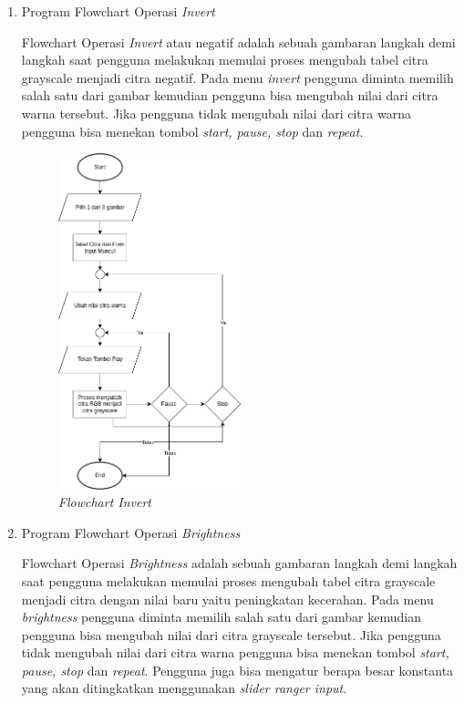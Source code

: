 \begin{enumerate}[leftmargin=1cm, itemindent=0.6cm,labelwidth=15pt, labelsep=5pt, listparindent=1cm,align=left]
\begin{enumerate}[leftmargin=1cm, itemindent=0.6cm,labelwidth=15pt, labelsep=5pt, listparindent=1cm,align=left]
\begin{enumerate}[leftmargin=1cm, itemindent=0.6cm,labelwidth=15pt, labelsep=5pt, listparindent=1cm,align=left]
    \item Program Flowchart Operasi \textit{Invert}

        Flowchart Operasi \textit{Invert} atau negatif adalah sebuah gambaran langkah demi langkah saat pengguna melakukan memulai proses mengubah tabel citra grayscale menjadi citra negatif. Pada menu \textit{invert} pengguna diminta memilih salah satu dari gambar kemudian pengguna bisa mengubah nilai dari citra warna tersebut. Jika pengguna tidak mengubah nilai dari citra warna pengguna bisa menekan tombol \textit{start, pause, stop} dan \textit{repeat}.


      \begin{figure}[ht]
          \includegraphics[width=0.5\textwidth, center]{images/flowchart-grayscale.png}
          \caption{\textit{Flowchart Invert}}
      \end{figure}

    \pagebreak

    \item Program Flowchart Operasi \textit{Brightness}

    Flowchart Operasi \textit{Brightness} adalah sebuah gambaran langkah demi langkah saat pengguna melakukan memulai proses mengubah tabel citra grayscale menjadi citra dengan nilai baru yaitu peningkatan kecerahan. Pada menu \textit{brightness} pengguna diminta memilih salah satu dari gambar kemudian pengguna bisa mengubah nilai dari citra grayscale tersebut. Jika pengguna tidak mengubah nilai dari citra warna pengguna bisa menekan tombol \textit{start, pause, stop} dan \textit{repeat}. Pengguna juga bisa mengatur berapa besar konstanta yang akan ditingkatkan menggunakan \textit{slider ranger input}.


\end{enumerate}
\end{enumerate}
\end{enumerate}
